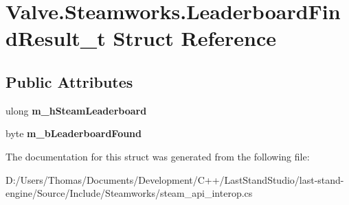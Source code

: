 \hypertarget{structValve_1_1Steamworks_1_1LeaderboardFindResult__t}{}\section{Valve.\+Steamworks.\+Leaderboard\+Find\+Result\+\_\+t Struct Reference}
\label{structValve_1_1Steamworks_1_1LeaderboardFindResult__t}
\subsection*{Public Attributes}
\begin{DoxyCompactItemize}
\item 
\hypertarget{structValve_1_1Steamworks_1_1LeaderboardFindResult__t_a46050c972bab2762d1537e77168feceb}{}ulong {\bfseries m\+\_\+h\+Steam\+Leaderboard}\label{structValve_1_1Steamworks_1_1LeaderboardFindResult__t_a46050c972bab2762d1537e77168feceb}

\item 
\hypertarget{structValve_1_1Steamworks_1_1LeaderboardFindResult__t_ae075c172dd3a0ee48f7b843f96818ac2}{}byte {\bfseries m\+\_\+b\+Leaderboard\+Found}\label{structValve_1_1Steamworks_1_1LeaderboardFindResult__t_ae075c172dd3a0ee48f7b843f96818ac2}

\end{DoxyCompactItemize}


The documentation for this struct was generated from the following file\+:\begin{DoxyCompactItemize}
\item 
D\+:/\+Users/\+Thomas/\+Documents/\+Development/\+C++/\+Last\+Stand\+Studio/last-\/stand-\/engine/\+Source/\+Include/\+Steamworks/steam\+\_\+api\+\_\+interop.\+cs\end{DoxyCompactItemize}
